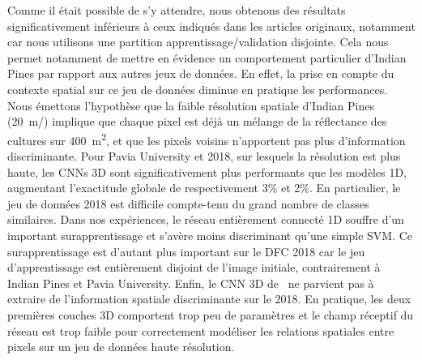 Comme il était possible de s'y attendre, nous obtenons des résultats significativement inférieurs à ceux indiqués dans les articles originaux, notamment car nous utilisons une partition apprentissage/validation disjointe. Cela nous permet notamment de mettre en évidence un comportement particulier d'Indian Pines par rapport aux autres jeux de données. En effet, la prise en compte du contexte spatial sur ce jeu de données diminue en pratique les performances. Nous émettons l'hypothèse que la faible résolution spatiale d'Indian Pines (\SI{20}{\meter/\px}) implique que chaque pixel est déjà un mélange de la réflectance des cultures sur \SI{400}{\meter\squared}, et que les pixels voisins n'apportent pas plus d'information discriminante.  Pour Pavia University et  2018, sur lesquels la résolution est plus haute, les \glspl{CNN} 3D sont significativement plus performants que les modèles 1D, augmentant l'exactitude globale de respectivement 3\% et 2\%. En particulier, le jeu de données  2018 est difficile compte-tenu du grand nombre de classes similaires. Dans nos expériences, le réseau entièrement connecté 1D souffre d'un important surapprentissage et s'avère moins discriminant qu'une simple \gls{SVM}. Ce surapprentissage est d'autant plus important sur le DFC 2018 car le jeu d'apprentissage est entièrement disjoint de l'image initiale, contrairement à Indian Pines et Pavia University. Enfin, le \gls{CNN} 3D de~\citet{ben_hamida_deep_2016} ne parvient pas à extraire de l'information spatiale discriminante sur le  2018. En pratique, les deux premières couches 3D comportent trop peu de paramètres et le champ réceptif du réseau est trop faible pour correctement modéliser les relations spatiales entre pixels sur un jeu de données haute résolution.

